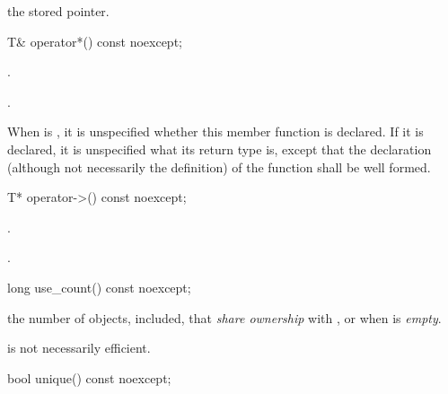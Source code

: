 \begin{itemdescr}
\pnum\returns  the stored pointer.
\end{itemdescr}

%
%
\begin{itemdecl}
T& operator*() const noexcept;
\end{itemdecl}

\begin{itemdescr}
\pnum\requires  {}.

\pnum\returns  {}.

\pnum\notes When  is , it is unspecified whether this
member function is declared. If it is declared, it is unspecified what its
return type is, except that the declaration (although not necessarily the
definition) of the function shall be well formed.
\end{itemdescr}

%
%
\begin{itemdecl}
T* operator->() const noexcept;
\end{itemdecl}

\begin{itemdescr}
\pnum\requires  {}.

\pnum\returns  {}.
\end{itemdescr}

%
%
\begin{itemdecl}
long use_count() const noexcept;
\end{itemdecl}

\begin{itemdescr}
\pnum\returns  the number of  objects,  included,
that \textit{share ownership} with , or  when  is
\textit{empty}.

\pnum \enternote {} is not necessarily
efficient.\exitnote
\end{itemdescr}

%
%
\begin{itemdecl}
bool unique() const noexcept;
\end{itemdecl}

